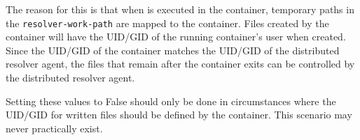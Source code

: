 The reason for this is that when \scaresolver is executed in the container, temporary paths
in the \texttt{resolver-work-path} are mapped to the container.  Files created by the container
will have the UID/GID of the running container's user when created.  Since the UID/GID of the
container matches the UID/GID of the distributed resolver agent, the files that remain after
the container exits can be controlled by the distributed resolver agent.

Setting these values to False should only be done in circumstances where the UID/GID for written files
should be defined by the container.  This scenario may never practically exist.

